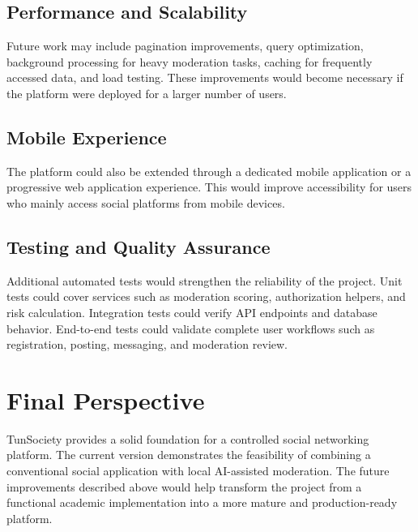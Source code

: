 \subsection{Performance and Scalability}

Future work may include pagination improvements, query optimization, background processing for heavy moderation tasks, caching for frequently accessed data, and load testing. These improvements would become necessary if the platform were deployed for a larger number of users.

\subsection{Mobile Experience}

The platform could also be extended through a dedicated mobile application or a progressive web application experience. This would improve accessibility for users who mainly access social platforms from mobile devices.

\subsection{Testing and Quality Assurance}

Additional automated tests would strengthen the reliability of the project. Unit tests could cover services such as moderation scoring, authorization helpers, and risk calculation. Integration tests could verify API endpoints and database behavior. End-to-end tests could validate complete user workflows such as registration, posting, messaging, and moderation review.

\section{Final Perspective}

TunSociety provides a solid foundation for a controlled social networking platform. The current version demonstrates the feasibility of combining a conventional social application with local AI-assisted moderation. The future improvements described above would help transform the project from a functional academic implementation into a more mature and production-ready platform.
